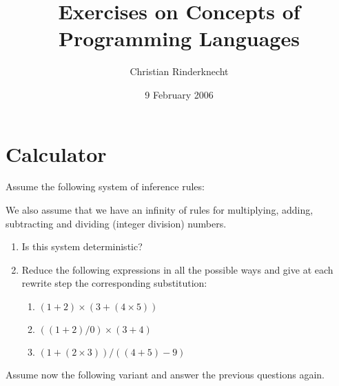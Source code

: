 \documentclass[11pt,a4paper]{article}
\title{Exercises on Concepts of Programming Languages}
\author{Christian Rinderknecht}
\date{9 February 2006}
\newcommand\rname[1]{\langle{#1}\rangle}
\begin{document}
\maketitle

\section{Calculator}

Assume the following system of inference rules:
We also assume that we have an infinity of rules for multiplying,
adding, subtracting and dividing (integer division) numbers.
\begin{enumerate}

  \item Is this system deterministic?

  \item Reduce the following expressions in all the possible ways and
    give at each rewrite step the corresponding substitution:
  \begin{enumerate}

    \item \((1 + 2) \times (3 + (4 \times 5))\)

    \item \(((1 + 2) / 0) \times (3 + 4)\)

    \item \((1 + (2 \times 3)) / ((4 + 5) - 9)\)

  \end{enumerate}

\end{enumerate}
Assume now the following variant and answer the previous questions again.
\end{document}
